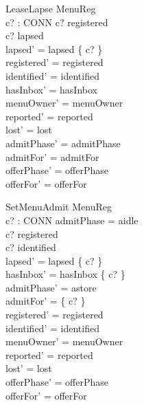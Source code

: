 \documentclass[a4paper,10pt,fleqn]{article}
\begin{document}
\begin{schema}{LeaseLapse}
  \Delta MenuReg \\
  c? : CONN
\where
  c? \in registered \\
  c? \notin lapsed \\
  lapsed' = lapsed \cup \{ c? \} \\
  registered' = registered \\
  identified' = identified \\
  hasInbox' = hasInbox \\
  menuOwner' = menuOwner \\
  reported' = reported \\
  lost' = lost \\
  admitPhase' = admitPhase \\
  admitFor' = admitFor \\
  offerPhase' = offerPhase \\
  offerFor' = offerFor
\end{schema}


\begin{schema}{SetMenuAdmit}
  \Delta MenuReg \\
  c? : CONN
\where
  admitPhase = aidle \\
  c? \in registered \\
  c? \in identified \\
  lapsed' = lapsed \setminus \{ c? \} \\
  hasInbox' = hasInbox \cup \{ c? \} \\
  admitPhase' = astore \\
  admitFor' = \{ c? \} \\
  registered' = registered \\
  identified' = identified \\
  menuOwner' = menuOwner \\
  reported' = reported \\
  lost' = lost \\
  offerPhase' = offerPhase \\
  offerFor' = offerFor
\end{schema}
\end{document}
